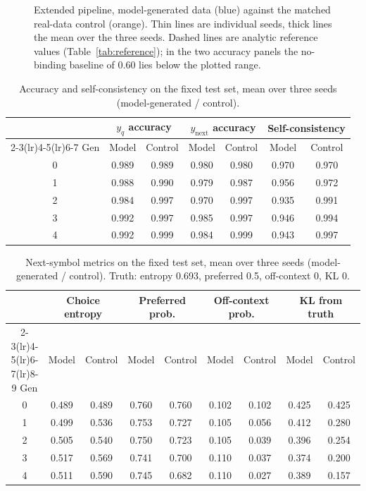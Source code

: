 \documentclass[11pt,a4paper]{article}
\newcommand{\ynext}{y_{\mathrm{next}}}
\newcommand{\yq}{y_{q}}
\begin{document}
\begin{figure}[htbp]
\smallskip
{}
\caption{Extended pipeline, model-generated data (blue) against the matched
real-data control (orange). Thin lines are individual seeds, thick lines the
mean over the three seeds. Dashed lines are analytic reference values
(Table~\ref{tab:reference}); in the two accuracy panels the no-binding
baseline of 0.60 lies below the plotted range.}
\label{fig:comparison}
\end{figure}

\begin{table}[htbp]
\centering
\small
\caption{Accuracy and self-consistency on the fixed test set, mean over three
seeds (model-generated / control).}
\label{tab:cmpA}
\begin{tabular}{c*{3}{cc}}
\toprule
 & \multicolumn{2}{c}{$\yq$ accuracy} & \multicolumn{2}{c}{$\ynext$ accuracy} & \multicolumn{2}{c}{Self-consistency}\\
\cmidrule(lr){2-3}\cmidrule(lr){4-5}\cmidrule(lr){6-7}
Gen & Model & Control & Model & Control & Model & Control\\
\midrule
0 & 0.989 & 0.989 & 0.980 & 0.980 & 0.970 & 0.970 \\
1 & 0.988 & 0.990 & 0.979 & 0.987 & 0.956 & 0.972 \\
2 & 0.984 & 0.997 & 0.970 & 0.997 & 0.935 & 0.991 \\
3 & 0.992 & 0.997 & 0.985 & 0.997 & 0.946 & 0.994 \\
4 & 0.992 & 0.999 & 0.984 & 0.999 & 0.943 & 0.997 \\
\bottomrule
\end{tabular}
\end{table}

\begin{table}[htbp]
\centering
\small
\setlength{\tabcolsep}{4.5pt}
\caption{Next-symbol metrics on the fixed test set, mean over three seeds
(model-generated / control). Truth: entropy 0.693, preferred 0.5, off-context
0, KL 0.}
\label{tab:cmpB}
\begin{tabular}{c*{4}{cc}}
\toprule
 & \multicolumn{2}{c}{Choice entropy} & \multicolumn{2}{c}{Preferred prob.} & \multicolumn{2}{c}{Off-context prob.} & \multicolumn{2}{c}{KL from truth}\\
\cmidrule(lr){2-3}\cmidrule(lr){4-5}\cmidrule(lr){6-7}\cmidrule(lr){8-9}
Gen & Model & Control & Model & Control & Model & Control & Model & Control\\
\midrule
0 & 0.489 & 0.489 & 0.760 & 0.760 & 0.102 & 0.102 & 0.425 & 0.425 \\
1 & 0.499 & 0.536 & 0.753 & 0.727 & 0.105 & 0.056 & 0.412 & 0.280 \\
2 & 0.505 & 0.540 & 0.750 & 0.723 & 0.105 & 0.039 & 0.396 & 0.254 \\
3 & 0.517 & 0.569 & 0.741 & 0.700 & 0.110 & 0.037 & 0.374 & 0.200 \\
4 & 0.511 & 0.590 & 0.745 & 0.682 & 0.110 & 0.027 & 0.389 & 0.157 \\
\bottomrule
\end{tabular}
\end{table}
\end{document}
